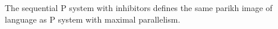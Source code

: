 \documentclass[a4paper,10pt]{article}
\begin{document}


\begin{veta}
  The sequential P system with inhibitors defines the same parikh image of language as P system with maximal parallelism.
\end{veta}
\end{document}
